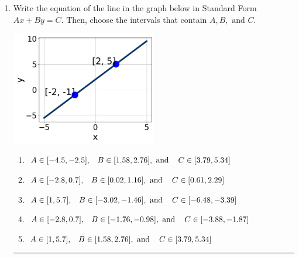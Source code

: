 \documentclass[14pt]{extbook}
\newcommand{\litem}[1]{\item#1\hspace*{-1cm}\rule{\textwidth}{0.4pt}}
\begin{document}
\begin{enumerate}
{\begin{enumerate}[label=\Alph*.]
\end{enumerate} }
\litem{
Write the equation of the line in the graph below in Standard Form $Ax+By=C$. Then, choose the intervals that contain $A, B, \text{ and } C$.
\begin{center}
    \includegraphics[width=0.5\textwidth]{../Figures/linearGraphToStandardCopyC.png}
\end{center}
\begin{enumerate}[label=\Alph*.]
\item \( A \in [-4.5, -2.5], \hspace{3mm} B \in [1.58, 2.76], \text{ and } \hspace{3mm} C \in [3.79, 5.34] \)
\item \( A \in [-2.8, 0.7], \hspace{3mm} B \in [0.02, 1.16], \text{ and } \hspace{3mm} C \in [0.61, 2.29] \)
\item \( A \in [1, 5.7], \hspace{3mm} B \in [-3.02, -1.46], \text{ and } \hspace{3mm} C \in [-6.48, -3.39] \)
\item \( A \in [-2.8, 0.7], \hspace{3mm} B \in [-1.76, -0.98], \text{ and } \hspace{3mm} C \in [-3.88, -1.87] \)
\item \( A \in [1, 5.7], \hspace{3mm} B \in [1.58, 2.76], \text{ and } \hspace{3mm} C \in [3.79, 5.34] \)


\end{enumerate}}
\end{enumerate}
\end{document}
